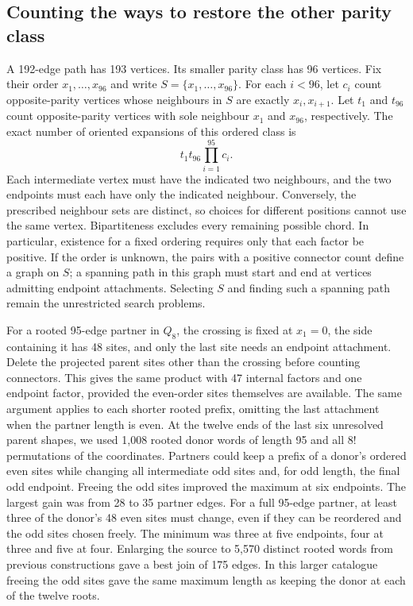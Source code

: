 \documentclass[11pt,a4paper]{article}
\theoremstyle{definition}
\theoremstyle{remark}
\begin{document}
\subsection{Counting the ways to restore the other parity class}
A 192-edge path has 193 vertices. Its smaller parity class has 96
vertices. Fix their order \(x_1,\ldots,x_{96}\) and write
\(S=\{x_1,\ldots,x_{96}\}\). For each \(i<96\), let \(c_i\) count
opposite-parity vertices whose neighbours in \(S\) are exactly
\(x_i,x_{i+1}\). Let \(t_1\) and \(t_{96}\) count opposite-parity
vertices with sole neighbour \(x_1\) and \(x_{96}\), respectively.
The exact number of oriented expansions of this ordered class is
\[
             t_1t_{96}\prod_{i=1}^{95}c_i .
\]
Each intermediate vertex must have the indicated two neighbours, and
the two endpoints must each have only the indicated neighbour.
Conversely, the prescribed neighbour sets are distinct, so choices
for different positions cannot use the same vertex. Bipartiteness
excludes every remaining possible chord. In particular, existence for
a fixed ordering requires only that each factor be positive. If the
order is unknown, the pairs with a positive connector count define a
graph on \(S\); a spanning path in this graph must start and end at
vertices admitting endpoint attachments. Selecting \(S\) and finding
such a spanning path remain the unrestricted search problems.

For a rooted 95-edge partner in \(Q_8\), the crossing is fixed at
\(x_1=0\), the side containing it has 48 sites, and only the last
site needs an endpoint attachment. Delete the projected parent sites
other than the crossing before counting connectors. This gives the
same product with 47 internal factors and one endpoint factor,
provided the even-order sites themselves are available. The same
argument applies to each shorter rooted prefix, omitting the last
attachment when the partner length is even.
At the twelve ends of the last six unresolved parent shapes, we used
1,008 rooted donor words of length 95 and all \(8!\) permutations of
the coordinates. Partners could keep a prefix of a donor's ordered even
sites while changing all intermediate odd sites and, for odd length,
the final odd endpoint. Freeing the odd sites improved the maximum
at six endpoints. The largest gain was from 28 to 35 partner edges.
For a full 95-edge partner, at least three of the donor's 48 even sites
must change, even if they can be reordered and the odd sites chosen
freely. The minimum was three at five endpoints, four at three and
five at four. Enlarging the source to 5,570 distinct rooted words from
previous constructions gave a best join of 175 edges. In this larger
catalogue freeing the odd sites gave the same maximum length as keeping
the donor at each of the twelve roots.
\end{document}
